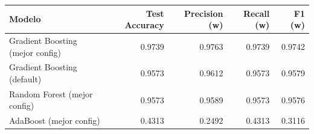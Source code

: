\begin{tabular}{lrrrr}
\toprule
Modelo & Test Accuracy & Precision (w) & Recall (w) & F1 (w) \\
\midrule
Gradient Boosting (mejor config) & 0.9739 & 0.9763 & 0.9739 & 0.9742 \\
Gradient Boosting (default) & 0.9573 & 0.9612 & 0.9573 & 0.9579 \\
Random Forest (mejor config) & 0.9573 & 0.9589 & 0.9573 & 0.9576 \\
AdaBoost (mejor config) & 0.4313 & 0.2492 & 0.4313 & 0.3116 \\
\bottomrule
\end{tabular}
